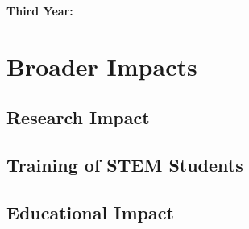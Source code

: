 \documentclass[11pt]{article}
\theoremstyle{theorem}
\theoremstyle{definition}
\begin{document}
\noindent\textbf{Third Year:}  
\section{Broader Impacts}

\subsection{Research Impact}


\subsection{Training of STEM Students}

\subsection{Educational Impact}    


\newpage

\end{document}
